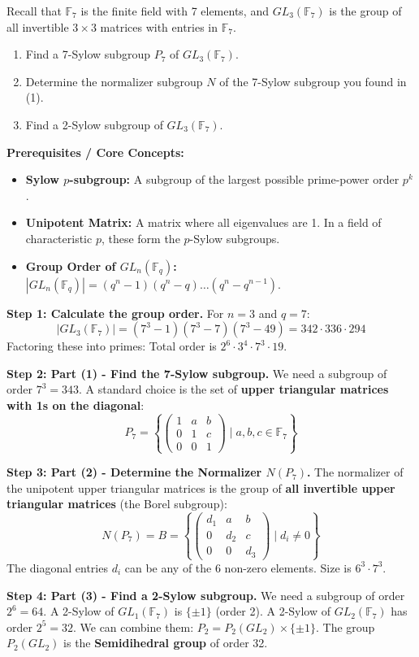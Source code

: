 \begin{exercise}
\label{algebra:2012:8}
Recall that $\mathbb{F}_7$ is the finite field with 7 elements, and $GL_3(\mathbb{F}_7)$ is the group of all invertible $3 \times 3$ matrices with entries in $\mathbb{F}_7$.
\begin{enumerate}
    \item Find a 7-Sylow subgroup $P_7$ of $GL_3(\mathbb{F}_7)$.
    \item Determine the normalizer subgroup $N$ of the 7-Sylow subgroup you found in (1).
    \item Find a 2-Sylow subgroup of $GL_3(\mathbb{F}_7)$.
\end{enumerate}
\end{exercise}

\begin{solution}
\textbf{Prerequisites / Core Concepts:}
\begin{itemize}
    \item \textbf{Sylow $p$-subgroup:} A subgroup of the largest possible prime-power order $p^k$.
    \item \textbf{Unipotent Matrix:} A matrix where all eigenvalues are 1. In a field of characteristic $p$, these form the $p$-Sylow subgroups.
    \item \textbf{Group Order of $GL_n(\mathbb{F}_q)$:} $|GL_n(\mathbb{F}_q)| = (q^n - 1)(q^n - q) \dots (q^n - q^{n-1})$.
\end{itemize}

\textbf{Step 1: Calculate the group order.}
For $n=3$ and $q=7$:
\[ |GL_3(\mathbb{F}_7)| = (7^3 - 1)(7^3 - 7)(7^3 - 49) = 342 \cdot 336 \cdot 294 \]
Factoring these into primes:
Total order is $2^6 \cdot 3^4 \cdot 7^3 \cdot 19$.

\textbf{Step 2: Part (1) - Find the 7-Sylow subgroup.}
We need a subgroup of order $7^3 = 343$.
A standard choice is the set of \textbf{upper triangular matrices with 1s on the diagonal}:
\[ P_7 = \left\{ \begin{pmatrix} 1 & a & b \\ 0 & 1 & c \\ 0 & 0 & 1 \end{pmatrix} \mid a, b, c \in \mathbb{F}_7 \right\} \]

\textbf{Step 3: Part (2) - Determine the Normalizer $N(P_7)$.}
The normalizer of the unipotent upper triangular matrices is the group of \textbf{all invertible upper triangular matrices} (the Borel subgroup):
\[ N(P_7) = B = \left\{ \begin{pmatrix} d_1 & a & b \\ 0 & d_2 & c \\ 0 & 0 & d_3 \end{pmatrix} \mid d_i \neq 0 \right\} \]
The diagonal entries $d_i$ can be any of the 6 non-zero elements. Size is $6^3 \cdot 7^3$.

\textbf{Step 4: Part (3) - Find a 2-Sylow subgroup.}
We need a subgroup of order $2^6 = 64$.
A 2-Sylow of $GL_1(\mathbb{F}_7)$ is $\{\pm 1\}$ (order 2).
A 2-Sylow of $GL_2(\mathbb{F}_7)$ has order $2^5 = 32$.
We can combine them: $P_2 = P_2(GL_2) \times \{ \pm 1 \}$.
The group $P_2(GL_2)$ is the \textbf{Semidihedral group} of order 32.
\end{solution}

